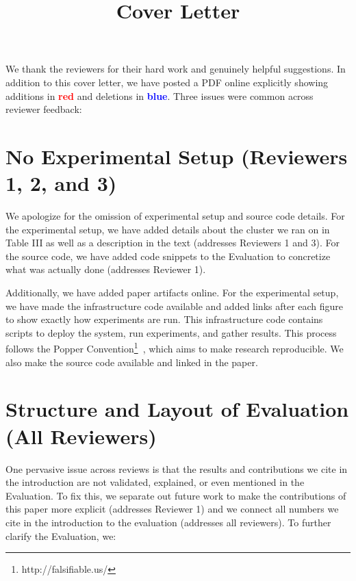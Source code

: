 \documentclass[onecolumn,conference]{IEEEtran}
\begin{document}
\title{Cover Letter}
\maketitle

We thank the reviewers for their hard work and genuinely helpful suggestions.
In addition to this cover letter, we have posted a PDF online explicitly
showing additions in \textcolor{red}{\textbf{red}} and deletions in
\textcolor{blue}{\textbf{blue}}. Three issues were common across reviewer
feedback:

\section{No Experimental Setup (Reviewers 1, 2, and 3)}

We apologize for the omission of experimental setup and source code details.
For the experimental setup, we have added details about the cluster we ran on
in Table III as well as a description in the text (addresses Reviewers 1 and
3). For the source code, we have added code snippets to the Evaluation to
concretize what was actually done (addresses Reviewer 1).  

Additionally, we have added paper artifacts online.  For the experimental
setup, we have made the infrastructure code available and added links after
each figure to show exactly how experiments are run.  This infrastructure code
contains scripts to deploy the system, run experiments, and gather results.
This process follows the Popper
Convention\footnote{http://falsifiable.us/}~\cite{jimenez_popper_2016}, which
aims to make research reproducible.  We also make the source code available and
linked in the paper.

\section{Structure and Layout of Evaluation (All Reviewers)}

One pervasive issue across reviews is that the results and contributions we
cite in the introduction are not validated, explained, or even mentioned in the
Evaluation.  To fix this, we separate out future work to make the contributions
of this paper more explicit (addresses Reviewer 1) and we connect all numbers
we cite in the introduction to the evaluation (addresses all reviewers).  To
further clarify the Evaluation, we:
\end{document}

